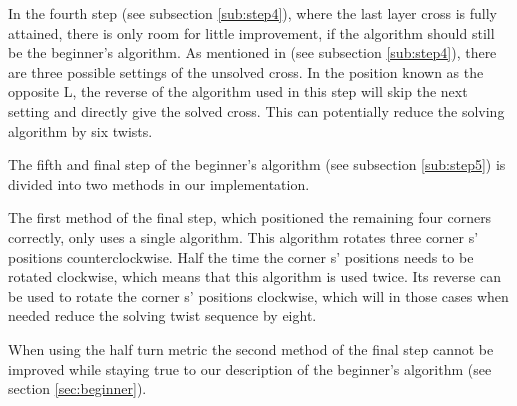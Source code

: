 In the fourth step (see subsection \ref{sub:step4}), where the last layer cross is fully attained, there is only room for little improvement, if the algorithm should still be the beginner's algorithm.
As mentioned in (see subsection \ref{sub:step4}), there are three possible settings of the unsolved cross.
In the position known as the opposite L, the reverse of the algorithm used in this step will skip the next setting and directly give the solved cross.
This can potentially reduce the solving algorithm by six twists.


The fifth and final step of the beginner's algorithm (see subsection \ref{sub:step5}) is divided into two methods in our implementation.


The first method of the final step, which positioned the remaining four corners correctly, only uses a single algorithm.
This algorithm rotates three corner \cpiece{}s' positions counterclockwise.
Half the time the corner \cpiece{}s' positions needs to be rotated clockwise, which means that this algorithm is used twice.
Its reverse can be used to rotate the corner \cpiece{}s' positions clockwise, which will in those cases when needed reduce the solving twist sequence by eight.

When using the half turn metric the second method of the final step cannot be improved while staying true to our description of the beginner's algorithm (see section \ref{sec:beginner}).